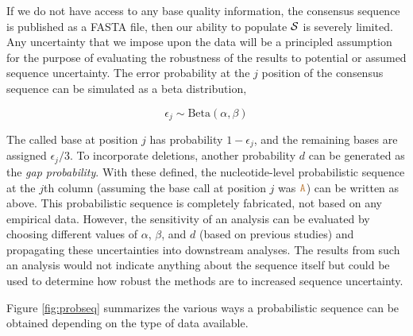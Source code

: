 \documentclass[12pt]{article}
\begin{document}
If we do not have access to any base quality information, \eg the consensus sequence is published as a FASTA file, then our ability to populate $\mathcal{S}$ is severely limited.
Any uncertainty that we impose upon the data will be a principled assumption for the purpose of evaluating the robustness of the results to potential or assumed sequence uncertainty.
The error probability at the $j$ position of the consensus sequence can be simulated as a beta distribution, \ie \vspace{-4mm}

$$
\epsilon_j \sim\text{Beta}(\alpha, \beta)
$$

The called base at position $j$ has probability $1-\epsilon_j$, and the remaining bases are assigned $\epsilon_j/3$.
To incorporate deletions, another probability $d$ can be generated as the \emph{gap probability}.
With these defined, the nucleotide-level probabilistic sequence at the $j$th column (assuming the base call at position $j$ was $\texttt{\textcolor{brown}{A}}$) can be written as above.
This probabilistic sequence is completely fabricated, \ie not based on any empirical data.
However, the sensitivity of an analysis can be evaluated by choosing different values of $\alpha$, $\beta$, and $d$ (\eg based on previous studies) and propagating these uncertainties into downstream analyses.
The results from such an analysis would not indicate anything about the sequence itself but could be used to determine how robust the methods are to increased sequence uncertainty.

Figure \ref{fig:probseq} summarizes the various ways a probabilistic sequence can be obtained depending on the type of data available.
\end{document}
